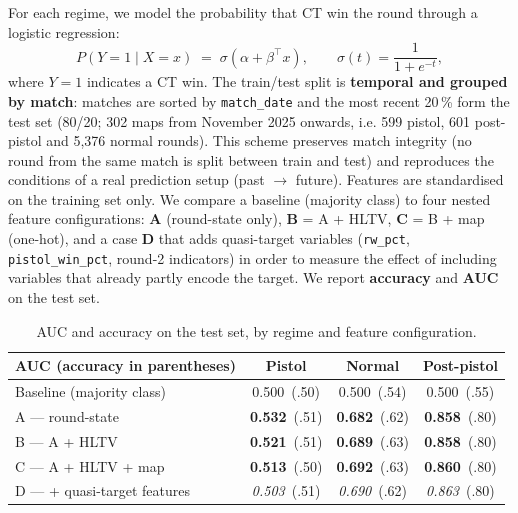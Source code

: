 For each regime, we model the probability that CT win the round
through a logistic regression:
\[
P(Y=1 \mid X = x) \;=\; \sigma\!\left(\alpha + \beta^{\!\top} x\right),
\qquad \sigma(t) = \frac{1}{1+e^{-t}},
\]
where $Y = 1$ indicates a CT win. The train/test split is
\textbf{temporal and grouped by match}: matches are sorted by
\texttt{match\_date} and the most recent 20\,\% form the test set
(80/20; 302 maps from November 2025 onwards, i.e. 599 pistol, 601
post-pistol and 5{,}376 normal rounds). This scheme preserves match integrity (no round from the
same match is split between train and test) and reproduces the
conditions of a real prediction setup (past $\rightarrow$ future).
Features are standardised on the training set only. We compare a
baseline (majority class) to four nested feature configurations:
\textbf{A} (round-state only), \textbf{B} = A + HLTV,
\textbf{C} = B + map (one-hot), and a case \textbf{D} that adds
quasi-target variables (\texttt{rw\_pct}, \texttt{pistol\_win\_pct},
round-2 indicators) in order to measure the effect of including
variables that already partly encode the target. We report
\textbf{accuracy} and \textbf{AUC} on the test set.

\begin{table}[H]
\centering
\small
\renewcommand{\arraystretch}{1.05}
\begin{tabular}{lccc}
\toprule
\textbf{AUC} \scriptsize{(accuracy in parentheses)} & \textbf{Pistol} & \textbf{Normal} & \textbf{Post-pistol} \\
\midrule
Baseline (majority class)     & 0.500~\scriptsize{(.50)} & 0.500~\scriptsize{(.54)} & 0.500~\scriptsize{(.55)} \\
A --- round-state             & \textbf{0.532}~\scriptsize{(.51)} & \textbf{0.682}~\scriptsize{(.62)} & \textbf{0.858}~\scriptsize{(.80)} \\
B --- A + HLTV                & \textbf{0.521}~\scriptsize{(.51)} & \textbf{0.689}~\scriptsize{(.63)} & \textbf{0.858}~\scriptsize{(.80)} \\
C --- A + HLTV + map          & \textbf{0.513}~\scriptsize{(.50)} & \textbf{0.692}~\scriptsize{(.63)} & \textbf{0.860}~\scriptsize{(.80)} \\
D --- + quasi-target features & \textit{0.503}~\scriptsize{(.51)} & \textit{0.690}~\scriptsize{(.62)} & \textit{0.863}~\scriptsize{(.80)} \\
\bottomrule
\end{tabular}
\caption{AUC and accuracy on the test set, by regime and feature
configuration.}
\label{tab:logreg}
\end{table}

